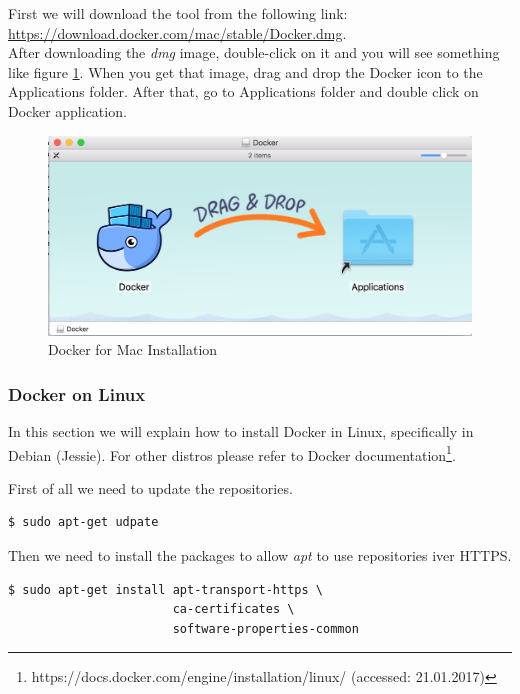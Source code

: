 First we will download the tool from the following link: \url{https://download.docker.com/mac/stable/Docker.dmg}.\\

After downloading the \textit{dmg} image, double-click on it and you will see something like figure \ref{fig:docker-mac-01}. When you get that image, drag and drop the Docker icon to the Applications folder. After that, go to Applications folder and double click on Docker application.

\begin{figure}[ht]
	\centering
    \includegraphics[width=\textwidth]{grafiken/docker-01}
    \caption{Docker for Mac Installation}
    \label{fig:docker-mac-01}
\end{figure}

\subsubsection{Docker on Linux}
In this section we will explain how to install Docker in Linux, specifically in Debian (Jessie). For other distros please refer to Docker documentation\footnote{https://docs.docker.com/engine/installation/linux/ (accessed: 21.01.2017)}.

First of all we need to update the repositories.

\begin{verbatim}
$ sudo apt-get udpate
\end{verbatim}

Then we need to install the packages to allow \textit{apt} to use repositories iver HTTPS.

\begin{verbatim}
$ sudo apt-get install apt-transport-https \
                       ca-certificates \
                       software-properties-common
\end{verbatim}

